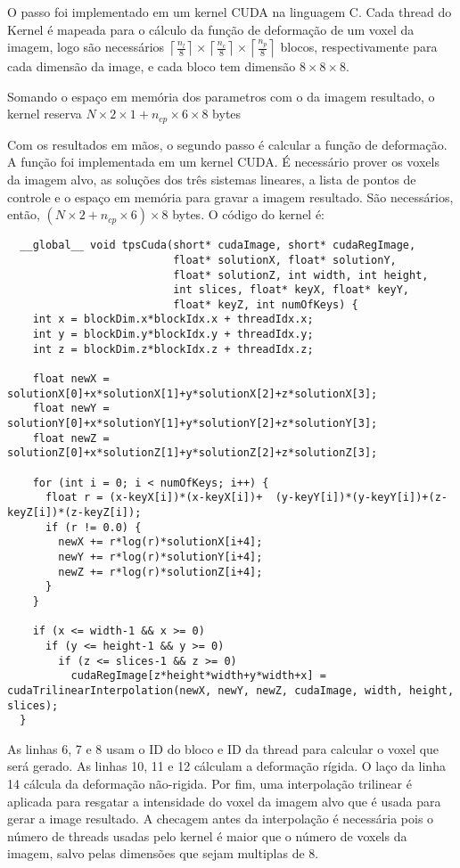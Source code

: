   O passo foi implementado em um kernel CUDA na linguagem C. Cada thread do Kernel
é mapeada para o cálculo da função de deformação de um voxel da imagem, logo são necessários
$\left \lceil{\frac{n_l}{8}}\right \rceil \times
\left \lceil{\frac{n_c}{8}}\right \rceil \times
\left \lceil{\frac{n_p}{8}}\right \rceil$ blocos, respectivamente para
cada dimensão da image, e cada bloco tem dimensão $8 \times 8 \times 8$.

  Somando o espaço em memória dos parametros com o da imagem resultado, o kernel
reserva $N \times 2 \times 1 + n_{cp} \times 6 \times 8$ bytes

  Com os resultados em mãos, o segundo passo é calcular a função de deformação.
A função foi implementada em um kernel CUDA. É necessário prover os voxels da
imagem alvo, as soluções dos três sistemas lineares, a lista de pontos de controle
e o espaço em memória para gravar a imagem resultado. São necessários, então,
$(N \times 2 + n_{cp} \times 6) \times 8$ bytes. O código do kernel é:

\begin{lstlisting}
  __global__ void tpsCuda(short* cudaImage, short* cudaRegImage,
                          float* solutionX, float* solutionY,
                          float* solutionZ, int width, int height,
                          int slices, float* keyX, float* keyY,
                          float* keyZ, int numOfKeys) {
    int x = blockDim.x*blockIdx.x + threadIdx.x;
    int y = blockDim.y*blockIdx.y + threadIdx.y;
    int z = blockDim.z*blockIdx.z + threadIdx.z;

    float newX = solutionX[0]+x*solutionX[1]+y*solutionX[2]+z*solutionX[3];
    float newY = solutionY[0]+x*solutionY[1]+y*solutionY[2]+z*solutionY[3];
    float newZ = solutionZ[0]+x*solutionZ[1]+y*solutionZ[2]+z*solutionZ[3];

    for (int i = 0; i < numOfKeys; i++) {
      float r = (x-keyX[i])*(x-keyX[i])+  (y-keyY[i])*(y-keyY[i])+(z-keyZ[i])*(z-keyZ[i]);
      if (r != 0.0) {
        newX += r*log(r)*solutionX[i+4];
        newY += r*log(r)*solutionY[i+4];
        newZ += r*log(r)*solutionZ[i+4];
      }
    }

    if (x <= width-1 && x >= 0)
      if (y <= height-1 && y >= 0)
        if (z <= slices-1 && z >= 0)
          cudaRegImage[z*height*width+y*width+x] = cudaTrilinearInterpolation(newX, newY, newZ, cudaImage, width, height, slices);
  }
\end{lstlisting}

  As linhas 6, 7 e 8 usam o ID do bloco e ID da thread para calcular o voxel que será
gerado. As linhas 10, 11 e 12 cálculam a deformação rígida. O laço da linha 14
cálcula da deformação não-rigida. Por fim, uma interpolação trilinear é aplicada
para resgatar a intensidade do voxel da imagem alvo que é usada para gerar a image
resultado. A checagem antes da interpolação é necessária pois o número de threads
usadas pelo kernel é maior que o número de voxels da imagem, salvo pelas dimensões
que sejam multiplas de 8.

